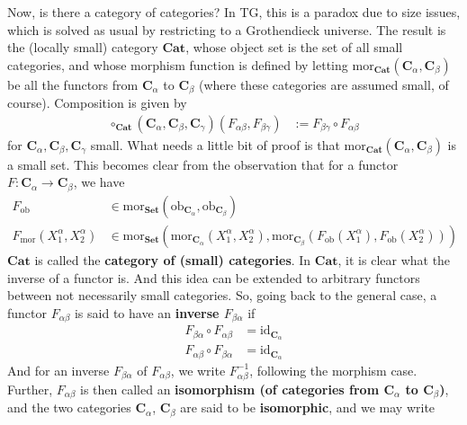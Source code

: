 Now, is there a category of categories? In TG, this is a paradox due to size issues, which is solved as usual by restricting to a Grothendieck universe.
The result is the (locally small) category $\mathbf{Cat}$, whose object set is the set of all small categories, and whose morphism function is defined by letting $\mathrm{mor}_{\mathbf{Cat}}(\mathbf{C}_{\alpha},\mathbf{C}_{\beta})$ be all the functors from $\mathbf{C}_{\alpha}$ to $\mathbf{C}_{\beta}$ (where these categories are assumed small, of course).
Composition is given by
\begin{align*}
  \circ_{\mathbf{Cat}}
  (\mathbf{C}_{\alpha},\mathbf{C}_{\beta},\mathbf{C}_{\gamma})
  (F_{\alpha\beta},F_{\beta\gamma})
  &:=
  F_{\beta\gamma}
  \circ
  F_{\alpha\beta}
\end{align*}
for $\mathbf{C}_{\alpha},\mathbf{C}_{\beta},\mathbf{C}_{\gamma}$ small.
What needs a little bit of proof is that $\mathrm{mor}_{\mathbf{Cat}}(\mathbf{C}_{\alpha},\mathbf{C}_{\beta})$ is a small set.
This becomes clear from the observation that for a functor $F \colon \mathbf{C}_{\alpha} \rightarrow \mathbf{C}_{\beta}$, we have
\begin{align*}
  F_{\mathrm{ob}}
  &\in
  \mathrm{mor}_{\mathbf{Set}}
  (\mathrm{ob}_{\mathbf{C}_{\alpha}},\mathrm{ob}_{\mathbf{C}_{\beta}})
  \\
  F_{\mathrm{mor}}(X_{1}^{\alpha},X_{2}^{\alpha})
  &\in
  \mathrm{mor}_{\mathbf{Set}}
  \left(
    \mathrm{mor}_{\mathbf{C}_{\alpha}}(X_{1}^{\alpha},X_{2}^{\alpha}),
    \mathrm{mor}_{\mathbf{C}_{\beta}}
    (F_{\mathrm{ob}}(X_{1}^{\alpha}),F_{\mathrm{ob}}(X_{2}^{\alpha}))
  \right)
\end{align*}
$\mathbf{Cat}$ is called the \textbf{category of (small) categories}.
In $\mathbf{Cat}$, it is clear what the inverse of a functor is.
And this idea can be extended to arbitrary functors between not necessarily small categories.
So, going back to the general case, a functor $F_{\alpha\beta}$ is said to have an \textbf{inverse $F_{\beta\alpha}$} if
\begin{align*}
  F_{\beta\alpha}
  \circ
  F_{\alpha\beta}
  &=
  \mathrm{id}_{\mathbf{C}_{\alpha}}
  \\
  F_{\alpha\beta}
  \circ
  F_{\beta\alpha}
  &=
  \mathrm{id}_{\mathbf{C}_{\alpha}}
\end{align*}
And for an inverse $F_{\beta\alpha}$ of $F_{\alpha\beta}$, we write $F_{\alpha\beta}^{-1}$, following the morphism case.
Further, $F_{\alpha\beta}$ is then called an \textbf{isomorphism (of categories from $\mathbf{C}_{\alpha}$ to $\mathbf{C}_{\beta}$)}, and the two categories $\mathbf{C}_{\alpha}$, $\mathbf{C}_{\beta}$ are said to be \textbf{isomorphic}, and we may write
